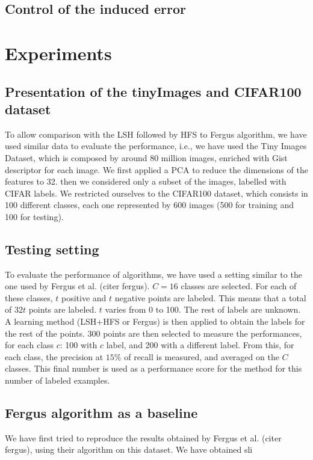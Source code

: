 \documentclass{article} %
\begin{document}
\subsection{Control of the induced error}

\section{Experiments}
\subsection{Presentation of the tinyImages and CIFAR100 dataset}
To allow comparison with the LSH followed by HFS to Fergus algorithm, we have used similar data to evaluate the performance, i.e., we have used the Tiny Images Dataset, which is composed by around 80 million images, enriched with Gist descriptor for each image. We first applied a PCA to reduce the dimensions of the features to 32. then we considered only a subset of the images, labelled with CIFAR labels. We restricted ourselves to the CIFAR100 dataset, which consists in 100 different classes, each one represented by 600 images (500 for training and 100 for testing).
 
\subsection{Testing setting}
To evaluate the performance of algorithms, we have used a setting similar to the one used by Fergus et al. (citer fergus). $C=16$ classes are selected. For each of these classes, $t$ positive and $t$ negative points are labeled. This means that a total of $32t$ points are labeled. $t$ varies from 0 to 100. The rest of labels are unknown. A learning method (LSH+HFS or Fergus) is then applied to obtain the labels for the rest of the points. 300 points are then selected to measure the performances, for each class $c$: 100 with $c$ label, and 200 with a different label. From this, for each class, the precision at $15\%$ of recall is measured, and averaged on the $C$ classes. This final number is used as a performance score for the method for this number of labeled examples.

 
\subsection{Fergus algorithm as a baseline}
We have first tried to reproduce the results obtained by Fergus et al. (citer fergus), using their algorithm on this dataset. We have obtained sli
\end{document}
